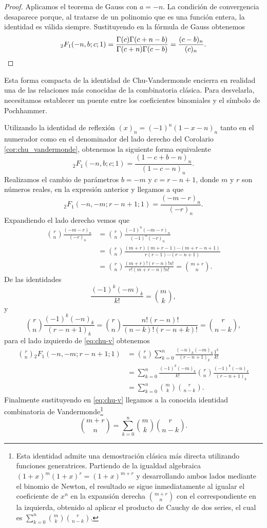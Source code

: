 \documentclass[12pt,a4paper]{book}
\begin{document}
\begin{proof}
Aplicamos el teorema de Gauss con $a = -n$. La condición de convergencia desaparece porque, al tratarse de un polinomio que es una función entera, la identidad es válida siempre. Sustituyendo en la fórmula de Gauss obtenemos
\[
{}_{2}F_{1}(-n, b; c; 1) = \frac{\Gamma(c)\Gamma(c + n - b)}{\Gamma(c + n)\Gamma(c - b)} = \frac{(c-b)_n}{(c)_n}.
\qedhere
\]
\end{proof}

Esta forma compacta de la identidad de Chu-Vandermonde encierra en realidad una de las relaciones más conocidas de la combinatoria clásica. Para desvelarla, necesitamos establecer un puente entre los coeficientes binomiales y el símbolo de Pochhammer.

Utilizando la identidad de reflexión $(x)_n = (-1)^n (1-x-n)_n$ tanto en el numerador como en el denominador del lado derecho del Corolario \ref{cor:chu_vandermonde}, obtenemos la siguiente forma equivalente
\[
{}_{2}F_{1}(-n, b; c; 1) = \frac{(1-c+b-n)_n}{(1-c-n)_n}.
\]
Realizamos el cambio de parámetros $b=-m$ y $c=r-n+1$, donde $m$ y $r$ son números reales, en la expresión anterior y llegamos a que
\begin{equation}
\label{eq:chu-v}
    {}_{2}F_{1}(-n, -m; r-n+1; 1) = \frac{(-m-r)_n}{(-r)_n}.
\end{equation}
Expandiendo el lado derecho vemos que
\begin{align*}
    \binom{r}{n}\frac{(-m-r)_n}{(-r)_n}
    &= \binom{r}{n}\frac{(-1)^n(-m-r)_n}{(-1)^n(-r)_n}\\
    &= \binom{r}{n}\frac{(m+r)(m+r-1)\cdots(m+r-n+1)}{r(r-1)\cdots(r-n+1)} \\
    &= \binom{r}{n}\frac{(m+r)!(r-n)!n!}{r!(m+r-n)!n!} = \binom{m+r}{n}.
\end{align*}
De las identidades
\[
    \frac{(-1)^k(-m)_k}{k!} = \binom{m}{k},
\]
y
\[
    \binom{r}{n}\frac{(-1)^k(-n)_k}{(r-n+1)_k} = \binom{r}{n}\frac{n!(r-n)!}{(n-k)!(r-n+k)!} = \binom{r}{n-k},
\]
para el lado izquierdo de \eqref{eq:chu-v} obtenemos
\begin{align*}
    \binom{r}{n}{}_{2}F_{1}(-n, -m; r-n+1; 1) &= \binom{r}{n}\sum_{k=0}^{n}\frac{(-n)_k(-m)_k}{(r-n+1)_k}\frac{1^k}{k!}\\
    &= \sum_{k=0}^{n}\frac{(-1)^k(-m)_k}{k!}\binom{r}{n}\frac{(-1)^k(-n)_k}{(r-n+1)_k}\\
    &= \sum_{k=0}^{n}\binom{m}{k}\binom{r}{n-k}.
\end{align*}
Finalmente sustituyendo en \eqref{eq:chu-v} llegamos a la conocida identidad combinatoria de Vandermonde\footnote{Esta identidad admite una demostración clásica más directa utilizando funciones generatrices. Partiendo de la igualdad algebraica $(1+x)^m (1+x)^r = (1+x)^{m+r}$ y desarrollando ambos lados mediante el binomio de Newton, el resultado se sigue inmediatamente al igualar el coeficiente de $x^n$ en la expansión derecha $\binom{m+r}{n}$ con el correspondiente en la izquierda, obtenido al aplicar el producto de Cauchy de dos series, el cual es $\sum_{k=0}^n \binom{m}{k}\binom{r}{n-k}$.}
\[
\binom{m+r}{n}=\sum_{k=0}^{n}\binom{m}{k}\binom{r}{n-k}.
\]
\end{document}
